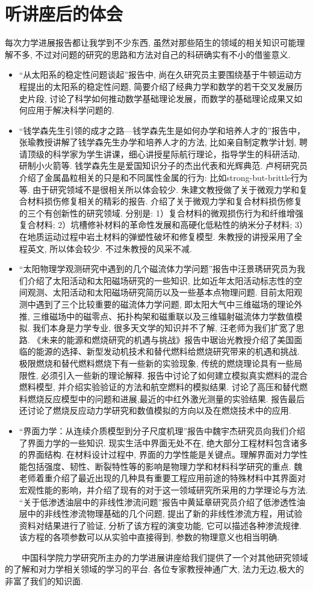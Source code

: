 \documentclass[11pt,a4paper,boxed]{caspset}
\begin{document}
\section{听讲座后的体会}
每次力学进展报告都让我学到不少东西, 虽然对那些陌生的领域的相关知识可能理解不多, 不过对问题的研究的思路和方法对自己的科研确实有不小的借鉴意义.
\begin{itemize}
\item ``从太阳系的稳定性问题谈起''报告中, 尚在久研究员主要围绕基于牛顿运动方程提出的太阳系的稳定性问题, 简要介绍了经典力学和数学的若干交叉发展历史片段, 讨论了科学如何推动数学基础理论发展，而数学的基础理论成果又如何应用于解决科学问题的.

\item ``钱学森先生引领的成才之路—钱学森先生是如何办学和培养人才的''报告中，张瑜教授讲解了钱学森先生办学和培养人才的方法, 比如亲自制定教学计划, 聘请顶级的科学家为学生讲课，细心讲授星际航行理论，指导学生的科研活动, 研制小火箭等. 钱学森先生是爱国知识分子的杰出代表和光辉典范.
卢柯研究员介绍了金属晶粒相关的只是和不同属性金属的行为: 比如strong-but-brittle行为等. 由于研究领域不是很相关所以体会较少.
朱建文教授做了关于微观力学和复合材料损伤修复相关的精彩的报告. 介绍了关于微观力学和复合材料损伤修复的三个有创新性的研究领域. 分别是: 1）复合材料的微观损伤行为和纤维增强复合材料; 2）坑槽修补材料的革命性发展和高硬化低粘性的纳米分子材料; 3）在地质运动过程中岩土材料的弹塑性破坏和修复模型. 朱教授的讲授采用了全程英文, 所以体会较少. 不过朱教授的风采不减.

\item ``太阳物理学观测研究中遇到的几个磁流体力学问题''报告中汪景琇研究员为我们介绍了太阳活动和太阳磁场研究的一些知识, 比如近年太阳活动标志性的空间观测、太阳活动和太阳磁场研究简历以及一些基本点物理问题. 目前太阳观测中遇到了三个比较重要的磁流体力学问题, 即太阳大气中三维磁场的理论外推, 三维磁场中的磁零点、拓扑构架和磁重联以及三维辐射磁流体力学数值模拟. 我们本身是力学专业, 很多天文学的知识并不了解, 汪老师为我们扩宽了思路. 《未来的能源和燃烧研究的机遇与挑战》报告中琚诒光教授介绍了美国面临的能源的选择、新型发动机技术和替代燃料给燃烧研究带来的机遇和挑战. 极限燃烧和替代燃料燃烧下有一些新的实验现象, 传统的燃烧理论具有一些局限性, 必须引入一些新的理论解释. 报告中讨论了如何建立模拟真实燃料的混合燃料模型, 并介绍实验验证的方法和航空燃料的模拟结果. 讨论了高压和替代燃料燃烧反应模型中的问题和进展,最近的中红外激光测量的实验结果. 报告最后还讨论了燃烧反应动力学研究和数值模拟的方向以及在燃烧技术中的应用.

\item ``界面力学：从连续介质模型到分子尺度机理''报告中魏宇杰研究员向我们介绍了界面力学的一些知识. 现实生活中界面无处不在, 绝大部分工程材料包含诸多的界面结构. 在材料设计过程中, 界面的力学性能是关键点。理解界面对力学性能包括强度、韧性、断裂特性等的影响是物理力学和材料科学研究的重点. 魏老师着重介绍了最近出现的几种具有重要工程应用前途的特殊材料中其界面对宏观性能的影响，并介绍了现有的对于这一领域研究所采用的力学理论与方法.
``关于低渗透油层中的非线性渗流问题''报告中黄延章研究员介绍了低渗透性油层中的非线性渗流物理基础的几个问题, 提出了新的非线性渗流方程，用试验资料对结果进行了验证, 分析了该方程的演变功能, 它可以描述各种渗流规律. 该方程的各项参数可以从实验中直接得到, 参数的物理意义也相当明确.
\end{itemize}

　　中国科学院力学研究所主办的力学进展讲座给我们提供了一个对其他研究领域的了解和对力学相关领域的学习的平台. 各位专家教授神通广大, 法力无边,极大的非富了我们的知识面.
\end{document}
